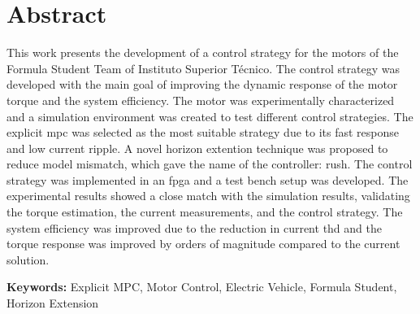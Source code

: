 
\section*{Abstract}


This work presents the development of a control strategy for the motors of the Formula Student Team of Instituto Superior Técnico. The control strategy was developed with the main goal of improving the dynamic response of the motor torque and the system efficiency. The motor was experimentally characterized and a simulation environment was created to test different control strategies. The explicit \gls{mpc} was selected as the most suitable strategy due to its fast response and low current ripple. A novel horizon extention technique was proposed to reduce model mismatch, which gave the name of the controller: \acrfull{rush}. The control strategy was implemented in an \gls{fpga} and a test bench setup was developed. The experimental results showed a close match with the simulation results, validating the torque estimation, the current measurements, and the control strategy. The system efficiency was improved due to the reduction in current \gls{thd} and the torque response was improved by orders of magnitude compared to the current solution.
\vfill

\textbf{\Large Keywords:} Explicit MPC, Motor Control, Electric Vehicle, Formula Student, Horizon Extension